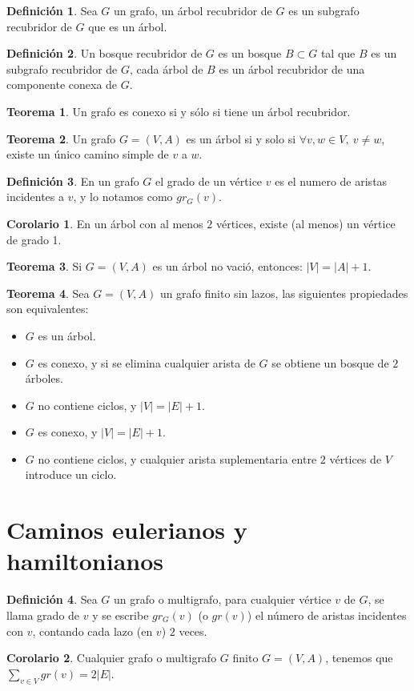 \documentclass[10pt]{article}
\theoremstyle{definition}
\newtheorem{definition}{Definición}[section]
\newtheorem{theorem}{Teorema}[section]
\newtheorem{corollary}{Corolario}[theorem]
\begin{document}
    \begin{definition}
        Sea $G$ un grafo, un árbol recubridor de $G$ es un subgrafo recubridor de $G$ que es un árbol.
    \end{definition}
    \begin{definition}
        Un bosque recubridor de $G$ es un bosque $B\subset G$ tal que $B$ es un subgrafo recubridor de $G$, cada árbol de $B$ es un árbol recubridor de una componente conexa de $G$.
    \end{definition}
    \begin{theorem}
        Un grafo es conexo si y sólo si tiene un árbol recubridor.
    \end{theorem}
    \begin{theorem}
        Un grafo $G=(V,A)$ es un árbol si y solo si $\forall v,w\in V,\ v\neq w$, existe un único camino simple de $v$ a $w$.
    \end{theorem}
    \begin{definition}
        En un grafo $G$ el grado de un vértice $v$ es el numero de aristas incidentes a $v$, y lo notamos como $gr_G(v)$.
    \end{definition}
    \begin{corollary}
        En un árbol con al menos $2$ vértices, existe (al menos) un vértice de grado 1.
    \end{corollary}
    \begin{theorem}
        Si $G=(V,A)$ es un árbol no vació, entonces: $|V|=|A|+1$. 
    \end{theorem}
    \begin{theorem}
        Sea $G=(V,A)$ un grafo finito sin lazos, las siguientes propiedades son equivalentes:
        \begin{itemize}
            \item $G$ es un árbol.
            \item $G$ es conexo, y si se elimina cualquier arista de $G$ se obtiene un bosque de $2$ árboles.
            \item $G$ no contiene ciclos, y $|V|=|E|+1$.
            \item $G$ es conexo, y $|V|=|E|+1$.
            \item $G$ no contiene ciclos, y cualquier arista suplementaria entre $2$ vértices de $V$ introduce un ciclo.
        \end{itemize}
    \end{theorem}
    \newpage\section{Caminos eulerianos y hamiltonianos}
    \begin{definition}
        Sea $G$ un grafo o multigrafo, para cualquier vértice $v$ de $G$, se llama grado de $v$ y se escribe $gr_G(v)$ (o $gr(v)$) el número de aristas incidentes con $v$, contando cada lazo (en $v$) $2$ veces.
    \end{definition}
    \begin{corollary}
        Cualquier grafo o multigrafo $G$ finito $G=(V,A)$, tenemos que $\sum_{v\in V} gr(v)=2|E|$.
    \end{corollary}
\end{document}
